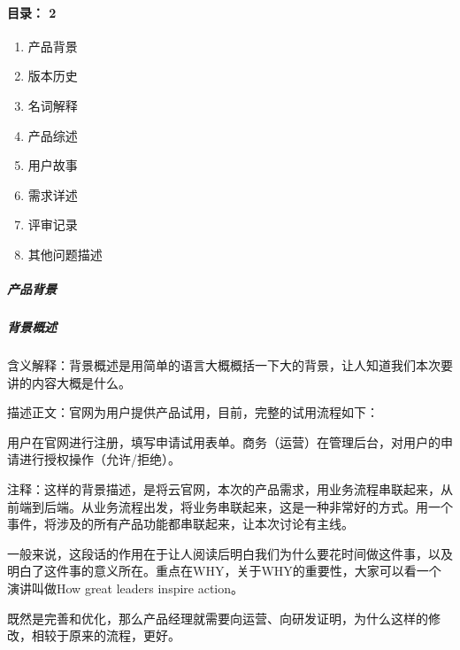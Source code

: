 \documentclass[letterpaper,11pt,english]{sphinxmanual}
\begin{document}
\paragraph{目录： 2\sphinxfootnotemark[492]}
\label{\detokenize{chapter_knowledge/PRD:id11}}%
\begin{footnotetext}[492]\sphinxAtStartFootnote
{}
%
\end{footnotetext}\ignorespaces \begin{enumerate}
%
\item {} 
产品背景

\item {} 
版本历史

\item {} 
名词解释

\item {} 
产品综述

\item {} 
用户故事

\item {} 
需求详述

\item {} 
评审记录

\item {} 
其他问题描述

\end{enumerate}


\subparagraph{产品背景}
\label{\detokenize{chapter_knowledge/PRD:id12}}

\subparagraph{背景概述}
\label{\detokenize{chapter_knowledge/PRD:id13}}
含义解释：背景概述是用简单的语言大概概括一下大的背景，让人知道我们本次要讲的内容大概是什么。

描述正文：官网为用户提供产品试用，目前，完整的试用流程如下：

用户在官网进行注册，填写申请试用表单。商务（运营）在管理后台，对用户的申请进行授权操作（允许/拒绝）。

注释：这样的背景描述，是将云官网，本次的产品需求，用业务流程串联起来，从前端到后端。从业务流程出发，将业务串联起来，这是一种非常好的方式。用一个事件，将涉及的所有产品功能都串联起来，让本次讨论有主线。

一般来说，这段话的作用在于让人阅读后明白我们为什么要花时间做这件事，以及明白了这件事的意义所在。重点在WHY，关于WHY的重要性，大家可以看一个演讲叫做How
great leaders inspire action。

既然是完善和优化，那么产品经理就需要向运营、向研发证明，为什么这样的修改，相较于原来的流程，更好。
\end{document}
